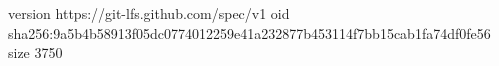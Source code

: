 version https://git-lfs.github.com/spec/v1
oid sha256:9a5b4b58913f05dc0774012259e41a232877b453114f7bb15cab1fa74df0fe56
size 3750
